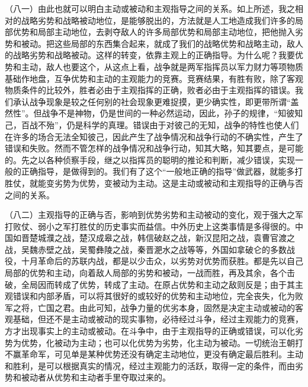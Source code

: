 \documentclass[UTF8, 12pt, a4paper]{ctexrep}
\begin{document}
（八一）由此也就可以明白主动或被动和主观指导之间的关系。如上所述，我之相对的战略劣势和战略被动地位，是能够脱出的，方法就是人工地造成我们许多的局部优势和局部主动地位，去剥夺敌人的许多局部优势和局部主动地位，把他抛入劣势和被动。把这些局部的东西集合起来，就成了我们的战略优势和战略主动，敌人的战略劣势和战略被动。这样的转变，依靠主观上的正确指导。为什么呢？我要优势和主动，敌人也要这个，从这点上看，战争就是两军指挥员以军力财力等项物质基础作地盘，互争优势和主动的主观能力的竞赛。竞赛结果，有胜有败，除了客观物质条件的比较外，胜者必由于主观指挥的正确，败者必由于主观指挥的错误。我们承认战争现象是较之任何别的社会现象更难捉摸，更少确实性，即更带所谓“盖然性”。但战争不是神物，仍是世间的一种必然运动，因此，孙子的规律，“知彼知己，百战不殆”，仍是科学的真理。错误由于对彼己的无知，战争的特性也使人们在许多的场合无法全知彼己，因此产生了战争情况和战争行动的不确实性，产生了错误和失败。然而不管怎样的战争情况和战争行动，知其大略，知其要点，是可能的。先之以各种侦察手段，继之以指挥员的聪明的推论和判断，减少错误，实现一般的正确指导，是做得到的。我们有了这个“一般地正确的指导”做武器，就能多打胜仗，就能变劣势为优势，变被动为主动。这是主动或被动和主观指导的正确与否之间的关系。

（八二）主观指导的正确与否，影响到优势劣势和主动被动的变化，观于强大之军打败仗、弱小之军打胜仗的历史事实而益信。中外历史上这类事情是多得很的。中国如晋楚城濮之战，楚汉成皋之战，韩信破赵之战，新汉昆阳之战，袁曹官渡之战，吴魏赤壁之战，吴蜀彝陵之战，秦晋淝水之战等等，外国如拿破仑的多数战役，十月革命后的苏联内战，都是以少击众，以劣势对优势而获胜。都是先以自己局部的优势和主动，向着敌人局部的劣势和被动，一战而胜，再及其余，各个击破，全局因而转成了优势，转成了主动。在原占优势和主动之敌则反是；由于其主观错误和内部矛盾，可以将其很好的或较好的优势和主动地位，完全丧失，化为败军之将，亡国之君。由此可知，战争力量的优劣本身，固然是决定主动或被动的客观基础，但还不是主动或被动的现实事物，必待经过斗争，经过主观能力的竞赛，方才出现事实上的主动或被动。在斗争中，由于主观指导的正确或错误，可以化劣势为优势，化被动为主动；也可以化优势为劣势，化主动为被动。一切统治王朝打不赢革命军，可见单是某种优势还没有确定主动地位，更没有确定最后胜利。主动和胜利，是可以根据真实的情况，经过主观能力的活跃，取得一定的条件，而由劣势和被动者从优势和主动者手里夺取过来的。
\end{document}
